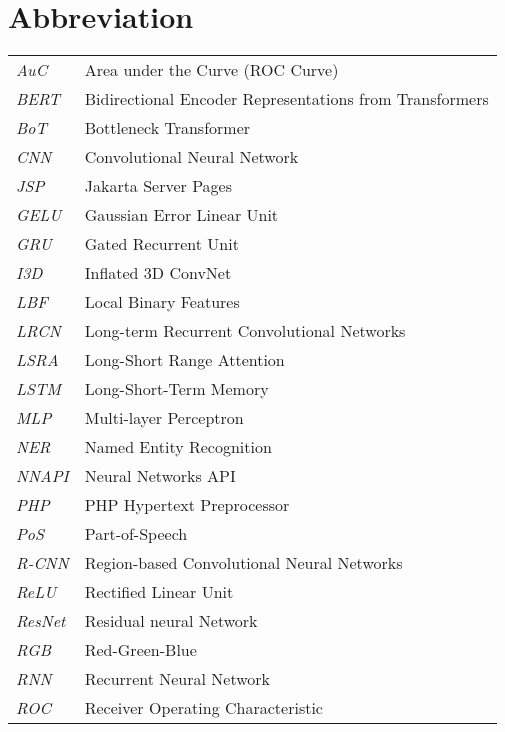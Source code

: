 \newpage
\makeatletter
\let\mcnewpage=\newpage
\newcommand{\TrickSupertabularIntoMulticols}{%
  \renewcommand\newpage{%
    \if@firstcolumn
      \hrule width\linewidth height0pt
      \columnbreak
    \else
      \mcnewpage
    \fi
  }%
}
\makeatother
\chapter{Abbreviation}
\begin{changemargin}{-0.5cm}{0cm}
\begin{multicols*}{2}
\TrickSupertabularIntoMulticols
\begin{supertabular}{>{\em}lp{6.2cm}}
AuC & Area under the Curve (ROC Curve) \\ [.5em]
BERT & Bidirectional Encoder Representations from Transformers \\ [.5em]
BoT & Bottleneck Transformer \\ [.5em]
CNN & Convolutional Neural Network \\ [.5em]
JSP & Jakarta Server Pages \\ [.5em]
GELU & Gaussian Error Linear Unit \\ [.5em]
GRU & Gated Recurrent Unit \\ [.5em]
I3D & Inflated 3D ConvNet \\ [.5em]
LBF & Local Binary Features \\ [.5em]
LRCN & Long-term Recurrent Convolutional Networks \\ [.5em]
LSRA & Long-Short Range Attention \\ [.5em]
LSTM & Long-Short-Term Memory \\ [.5em]
MLP & Multi-layer Perceptron \\ [.5em]
NER & Named Entity Recognition \\ [.5em]
NNAPI & Neural Networks API \\ [.5em]
PHP & PHP Hypertext Preprocessor \\ [.5em]
PoS & Part-of-Speech \\ [.5em]
R-CNN & Region-based Convolutional Neural Networks \\ [.5em]
ReLU & Rectified Linear Unit \\ [.5em]
ResNet & Residual neural Network \\ [.5em]
RGB & Red-Green-Blue \\ [.5em]
RNN & Recurrent Neural Network \\ [.5em]
ROC & Receiver Operating Characteristic \\ [.5em]

\end{supertabular}
\end{multicols*}
\end{changemargin}
